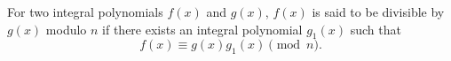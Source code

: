 For two integral polynomials $f(x)$ and $g(x)$, $f(x)$ is said to be divisible by $g(x)$ modulo $n$ if there exists an integral polynomial $g_1(x)$ such that
$$f(x) \equiv g(x) g_1(x) \pmod{n}.$$
